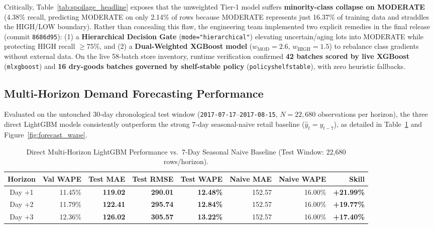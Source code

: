 \documentclass[11pt,a4paper]{article}
\renewcommand{\_}{\oldunderscore\allowbreak}
\begin{document}
Critically, Table~\ref{tab:spoilage_headline} exposes that the unweighted Tier-1 model suffers \textbf{minority-class collapse on MODERATE} (4.38\% recall, predicting MODERATE on only 2.14\% of rows because MODERATE represents just 16.37\% of training data and straddles the HIGH/LOW boundary). Rather than concealing this flaw, the engineering team implemented two explicit remedies in the final release (commit \texttt{8686d95}): (1) a \textbf{Hierarchical Decision Gate} (\texttt{mode="hierarchical"}) elevating uncertain/aging lots into MODERATE while protecting HIGH recall $\ge 75\%$, and (2) a \textbf{Dual-Weighted XGBoost model} ($w_{\text{MOD}}=2.6$, $w_{\text{HIGH}}=1.5$) to rebalance class gradients without external data. On the live 58-batch store inventory, runtime verification confirmed \textbf{42 batches scored by live XGBoost} (\texttt{ml\_xgboost}) and \textbf{16 dry-goods batches governed by shelf-stable policy} (\texttt{policy\_shelf\_stable}), with zero heuristic fallbacks.

\subsection{Multi-Horizon Demand Forecasting Performance}
Evaluated on the untouched 30-day chronological test window (\texttt{2017-07-17}--\texttt{2017-08-15}, $N = 22{,}680$ observations per horizon), the three direct LightGBM models consistently outperform the strong 7-day seasonal-naive retail baseline ($\hat{y}_t = y_{t-7}$), as detailed in Table~\ref{tab:forecast_headline} and Figure~\ref{fig:forecast_wape}.

\begin{table}[H]
\centering
\caption{Direct Multi-Horizon LightGBM Performance vs.\ 7-Day Seasonal Naive Baseline (Test Window: 22,680 rows/horizon).}
\label{tab:forecast_headline}
\renewcommand{\arraystretch}{1.15}
\setlength{\tabcolsep}{4.5pt}
{\footnotesize
\begin{tabular}{@{} c r r r r r r r @{}}
\toprule
\rowcolor{NavyPrimary}
\color{white}\textbf{Horizon} & \color{white}\textbf{Val WAPE} & \color{white}\textbf{Test MAE} & \color{white}\textbf{Test RMSE} & \color{white}\textbf{Test WAPE} & \color{white}\textbf{Naive MAE} & \color{white}\textbf{Naive WAPE} & \color{white}\textbf{Skill} \\
\midrule
Day +1 & 11.45\% & \textbf{119.02} & \textbf{290.01} & \textbf{12.48\%} & 152.57 & 16.00\% & \textbf{+21.99\%} \\
\rowcolor{LightBg}
Day +2 & 11.79\% & \textbf{122.41} & \textbf{295.74} & \textbf{12.84\%} & 152.57 & 16.00\% & \textbf{+19.77\%} \\
Day +3 & 12.36\% & \textbf{126.02} & \textbf{305.57} & \textbf{13.22\%} & 152.57 & 16.00\% & \textbf{+17.40\%} \\
\bottomrule
\end{tabular}}
\end{table}
\end{document}
